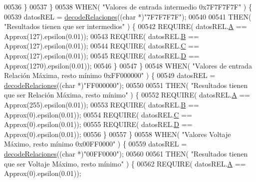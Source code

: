 \begin{DoxyCode}
{{{00536             \}
00537         \}
00538         WHEN( \textcolor{stringliteral}{"Valores de entrada intermedio 0x7F7F7F7F"} ) \{
00539             datosREL = \hyperlink{decoders_8cpp_a88d7079325bf81705583d9f2101cfa15}{decodeRelaciones}((\textcolor{keywordtype}{char} *)\textcolor{stringliteral}{"7F7F7F7F"});
00540 
00541             THEN( \textcolor{stringliteral}{"Resultados tienen que ser intermedios"} ) \{
00542                 REQUIRE( datosREL.\hyperlink{structRelacionesResponse_a560d1e6af01b999625b467ef3f858181}{A} == Approx(127).epsilon(0.01));
00543                 REQUIRE( datosREL.\hyperlink{structRelacionesResponse_a1216f6019af393dd85853f352533ed9d}{B} == Approx(127).epsilon(0.01));
00544                 REQUIRE( datosREL.\hyperlink{structRelacionesResponse_a37feda02f128b77f4f2d61cabcddc9e7}{C} == Approx(127).epsilon(0.01));
00545                 REQUIRE( datosREL.\hyperlink{structRelacionesResponse_ab76f55b12df3754a9bb5b102a1c06cbc}{D} == Approx(1270).epsilon(0.01));
00546             \}
00547         \}
00548         WHEN( \textcolor{stringliteral}{"Valores de entrada Relación Máxima, resto mínimo 0xFF000000"} ) \{
00549             datosREL = \hyperlink{decoders_8cpp_a88d7079325bf81705583d9f2101cfa15}{decodeRelaciones}((\textcolor{keywordtype}{char} *)\textcolor{stringliteral}{"FF000000"});
00550 
00551             THEN( \textcolor{stringliteral}{"Resultados tienen que ser Relación Máxima, resto mínimo"} ) \{
00552                 REQUIRE( datosREL.\hyperlink{structRelacionesResponse_a560d1e6af01b999625b467ef3f858181}{A} == Approx(255).epsilon(0.01));
00553                 REQUIRE( datosREL.\hyperlink{structRelacionesResponse_a1216f6019af393dd85853f352533ed9d}{B} == Approx(0).epsilon(0.01));
00554                 REQUIRE( datosREL.\hyperlink{structRelacionesResponse_a37feda02f128b77f4f2d61cabcddc9e7}{C} == Approx(0).epsilon(0.01));
00555                 REQUIRE( datosREL.\hyperlink{structRelacionesResponse_ab76f55b12df3754a9bb5b102a1c06cbc}{D} == Approx(0).epsilon(0.01));
00556             \}
00557         \}
00558         WHEN( \textcolor{stringliteral}{"Valores Voltaje Máximo, resto mínimo 0x00FF0000"} ) \{
00559             datosREL = \hyperlink{decoders_8cpp_a88d7079325bf81705583d9f2101cfa15}{decodeRelaciones}((\textcolor{keywordtype}{char} *)\textcolor{stringliteral}{"00FF0000"});
00560 
00561             THEN( \textcolor{stringliteral}{"Resultados tienen que ser Voltaje Máximo, resto mínimo"} ) \{
00562                 REQUIRE( datosREL.\hyperlink{structRelacionesResponse_a560d1e6af01b999625b467ef3f858181}{A} == Approx(0).epsilon(0.01));
}}}
\end{DoxyCode}
